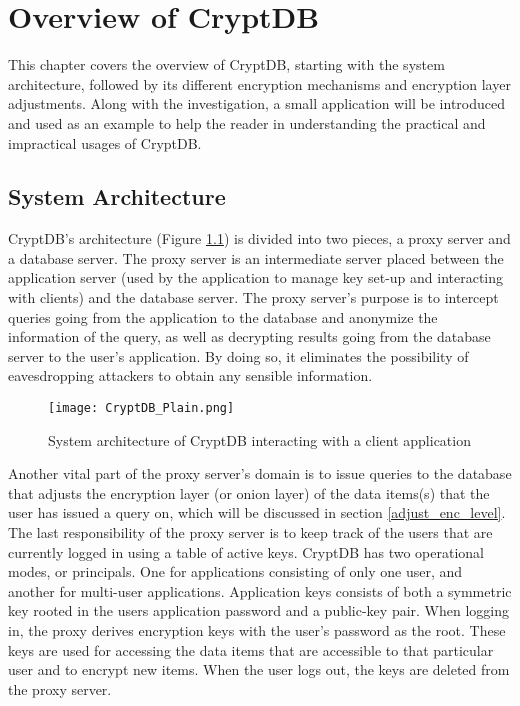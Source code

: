 \chapter{Overview of CryptDB}
\label{chp:overview_cryptDB}


This chapter covers the overview of CryptDB, starting with the system architecture, followed by its different encryption mechanisms and encryption layer adjustments. Along with the investigation, a small application will be introduced and used as an example to help the reader in understanding the practical and impractical usages of CryptDB.

\section{System Architecture}

CryptDB's architecture (Figure \ref{cryptdb_plain}) is divided into two pieces, a proxy server and a database server. The proxy server is an intermediate server placed between the application server (used by the application to manage key set-up and interacting with clients) and the database server. The proxy server's purpose is to intercept queries going from the application to the database and anonymize the information of the query, as well as decrypting results going from the database server to the user's application. By doing so, it eliminates the possibility of eavesdropping attackers to obtain any sensible information. %

\begin{figure}[H]
	\texttt{[image: CryptDB\_Plain.png]}
	\caption{System architecture of CryptDB interacting with a client application}
	\label{cryptdb_plain}
\end{figure}

Another vital part of the proxy server's domain is to issue queries to the database that adjusts the encryption layer (or onion layer) of the data items(s) that the user has issued a query on, which will be discussed in section \ref{adjust_enc_level}. The last responsibility of the proxy server is to keep track of the users that are currently logged in using a table of active keys. CryptDB has two operational modes, or principals. One for applications consisting of only one user, and another for multi-user applications. Application keys consists of both a symmetric key rooted in the users application password and a public-key pair. When logging in, the proxy derives encryption keys with the user's password as the root. These keys are used for accessing the data items that are accessible to that particular user and to encrypt new items. When the user logs out, the keys are deleted from the proxy server.

